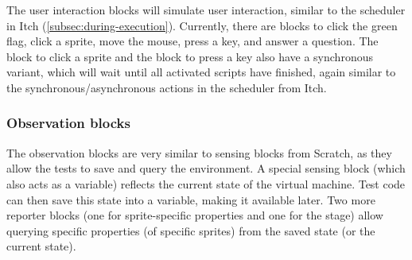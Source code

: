 \documentclass[../main]{subfiles}
\begin{document}
\begin{varwidth}{0.5\linewidth}
    \begin{scratch}[scale=0.6]
    \end{scratch}
\end{varwidth}%
\hspace{1em}%
\begin{varwidth}{0.5\linewidth}
    \begin{scratch}[scale=0.6]
    \end{scratch}
\end{varwidth}%

The user interaction blocks will simulate user interaction, similar to the scheduler in Itch (\cref{subsec:during-execution}).
Currently, there are blocks to click the green flag, click a sprite, move the mouse, press a key, and answer a question.
The block to click a sprite and the block to press a key also have a synchronous variant, which will wait until all activated scripts have finished, again similar to the synchronous/asynchronous actions in the scheduler from Itch.

\subsubsection{Observation blocks}

\begin{varwidth}{0.2\linewidth}
\end{varwidth}%
\hspace{1em}%
\begin{varwidth}{0.5\linewidth}
\end{varwidth}%
\hspace{1em}%
\begin{varwidth}{0.3\linewidth}
\end{varwidth}

The observation blocks are very similar to sensing blocks from Scratch, as they allow the tests to save and query the environment.
A special sensing block (which also acts as a variable) reflects the current state of the virtual machine.
Test code can then save this state into a variable, making it available later.
Two more reporter blocks (one for sprite-specific properties and one for the stage) allow querying specific properties (of specific sprites) from the saved state (or the current state).
\end{document}
